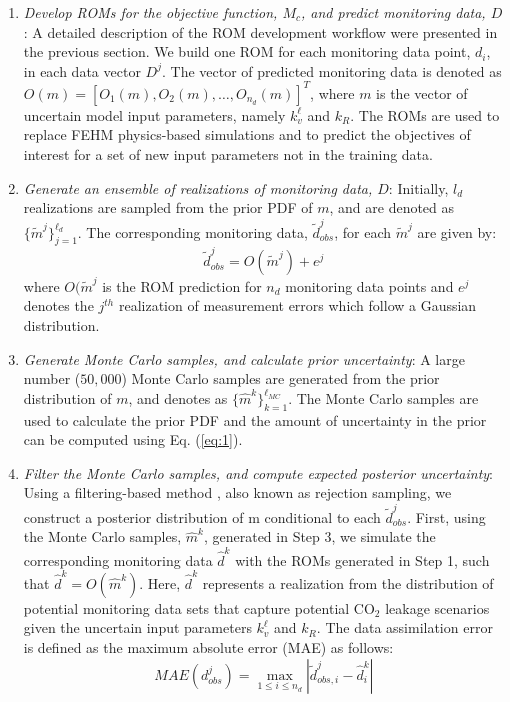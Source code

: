 \documentclass[a4paper,fleqn]{cas-sc}
\begin{document}
\begin{enumerate}[Step 1.]
\item \textit{Develop ROMs for the objective function, $M_c$, and predict monitoring data, $D$}: A detailed description of the ROM development workflow were presented in the previous section. We build one ROM for each monitoring data point, $d_i$, in each data vector $D^j$. The vector of predicted monitoring data is denoted as $O(m)=[O_1(m), O_2(m), \ldots,O_{n_d}(m)]^T$, where $m$ is the vector of uncertain model input parameters, namely $k_v^\ell$ and $k_R$. The ROMs are used to replace FEHM physics-based simulations and to predict the objectives of interest for a set of new input parameters not in the training data.

\item \textit{Generate an ensemble of realizations of monitoring data, $D$}: Initially, $l_d$ realizations are sampled from the prior PDF of $m$, and are denoted as $ \{\widetilde{m}^j\}_{j=1}^{\ell_d}$. The corresponding monitoring data, $\widetilde{d}_{obs}^j$, for each $\widetilde{m}^j$ are given by:
\begin{equation} \label{eq:4}
    \widetilde{d}_{obs}^j = O(\widetilde{m}^j) + e^j
\end{equation}
where $O(\widetilde{m}^j$ is the ROM prediction for $n_d$ monitoring data points and $e^j$ denotes the $j^{th}$ realization of measurement errors which follow a Gaussian distribution.

\item \textit{Generate Monte Carlo samples, and calculate prior uncertainty}: A large number ($50,000$) Monte Carlo samples are generated from the prior distribution of $m$, and denotes as $\{\hat{m}^k\}_{k=1}^{\ell_{MC}}$. The Monte Carlo samples are used to calculate the prior PDF and the amount of uncertainty in the prior can be computed using Eq. (\ref{eq:1}).

\item \textit{Filter the Monte Carlo samples, and compute expected posterior uncertainty}: Using a filtering-based method \citep{Caers2011}, also known as rejection sampling, we construct a posterior distribution of m conditional to each $\widetilde{d}_{obs}^j$. First, using the Monte Carlo samples, $\hat{m}^k$, generated in Step 3, we simulate the corresponding monitoring data $\hat{d}^k$ with the ROMs generated in Step 1, such that $\hat{d}^k=O(\hat{m}^k)$. Here, $\hat{d}^k$ represents a realization from the distribution of potential monitoring data sets that capture potential CO$_2$ leakage scenarios given the uncertain input parameters $k_v^\ell$ and $k_R$. The data assimilation error is defined as the maximum absolute error (MAE) as follows:
\begin{equation} \label{eq:5}
    MAE(d^j_{obs}) = \max\limits_{1\leq i \leq n_d} | \widetilde{d}^j_{obs,i} - \hat{d}^k_i | 
\end{equation}


\end{enumerate}
\end{document}
